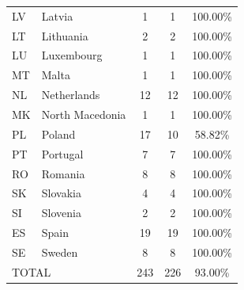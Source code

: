 \documentclass[a4paper,11pt,oneside]{article}
\begin{document}
\begin{table}[]
\begin{tabular}{llccc}
LV        & Latvia          & 1                                  & 1                 & 100.00\%            \\
LT        & Lithuania       & 2                                  & 2                 & 100.00\%            \\
LU        & Luxembourg      & 1                                  & 1                 & 100.00\%            \\
MT        & Malta           & 1                                  & 1                 & 100.00\%            \\
NL        & Netherlands     & 12                                 & 12                & 100.00\%            \\
MK        & North Macedonia & 1                                  & 1                 & 100.00\%            \\
PL        & Poland          & 17                                 & 10                & 58.82\%             \\
PT        & Portugal        & 7                                  & 7                 & 100.00\%            \\
RO        & Romania         & 8                                  & 8                 & 100.00\%            \\
SK        & Slovakia        & 4                                  & 4                 & 100.00\%            \\
SI        & Slovenia        & 2                                  & 2                 & 100.00\%            \\
ES        & Spain           & 19                                 & 19                & 100.00\%            \\
SE        & Sweden          & 8                                  & 8                 & 100.00\%            \\
\midrule
\multicolumn{2}{l}{TOTAL}   & 243                                & 226               & 93.00\%            \\
\bottomrule
\end{tabular}
\end{table}

\pagebreak
\clearpage
\end{document}
